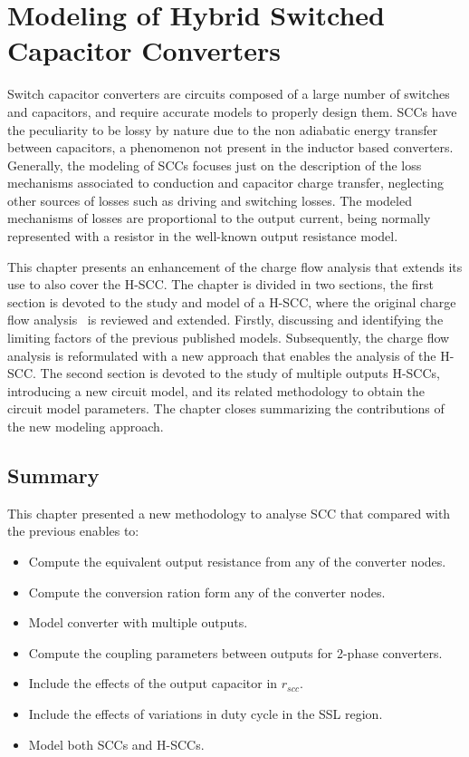 \chapter[Modeling of H-SCC]{Modeling of Hybrid Switched Capacitor Converters}
\label{ch:modeling}
Switch capacitor converters are circuits composed of a large number of switches and capacitors, and require accurate models to properly design them. SCCs have the peculiarity to be lossy by nature due to the non adiabatic energy transfer between capacitors, a phenomenon not present in the inductor based converters. Generally, the modeling of SCCs focuses just on the description of the loss mechanisms associated to conduction and capacitor charge transfer, neglecting other sources of losses such as driving and switching losses. The modeled mechanisms of losses are proportional to the output current, being  normally represented with a resistor in the well-known output resistance model.

This chapter presents an enhancement of the charge flow analysis that extends its use to also cover the H-SCC.   The chapter is divided in two sections, the first section is devoted to the study and model of a H-SCC, where the original charge flow analysis~\cite{95Makowski,Seeman:EECS-2009-78} is reviewed and extended. Firstly, discussing and identifying the limiting factors of the previous published models. Subsequently, the charge flow analysis is reformulated with a new approach that enables the analysis of the H-SCC. The second section is devoted to the study of multiple outputs H-SCCs, introducing a new circuit model, and its related methodology to obtain the circuit model parameters. The chapter closes summarizing the contributions of the new modeling approach.




\section{Summary}
This chapter presented a new methodology to analyse SCC that compared with the previous enables to:
\begin{itemize}
  \item Compute the equivalent output resistance from any of the converter nodes.
  \item Compute the conversion ration form any of the converter nodes.
  \item Model converter with multiple outputs.
  \item Compute the coupling parameters between outputs for 2-phase converters.
  \item Include the effects of the output capacitor in $r_{scc}$.
  \item Include the effects of variations in duty cycle in the SSL region.
  \item Model both SCCs and H-SCCs.
\end{itemize}

